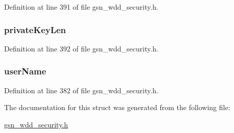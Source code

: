 Definition at line 391 of file gsn\_\-wdd\_\-security.h.

\hypertarget{a00287_a17491f8d62936a04e441ef96177f42f4}{
\subsubsection[{privateKeyLen}]{ {\bf privateKeyLen}}}
\label{a00287_a17491f8d62936a04e441ef96177f42f4}


Definition at line 392 of file gsn\_\-wdd\_\-security.h.

\hypertarget{a00287_ab1d98f2c44a108ee6359de8e3b3dd140}{
\subsubsection[{userName}]{ {\bf userName}}}
\label{a00287_ab1d98f2c44a108ee6359de8e3b3dd140}


Definition at line 382 of file gsn\_\-wdd\_\-security.h.



The documentation for this struct was generated from the following file:\begin{DoxyCompactItemize}
\item 
\hyperlink{a00604}{gsn\_\-wdd\_\-security.h}\end{DoxyCompactItemize}

